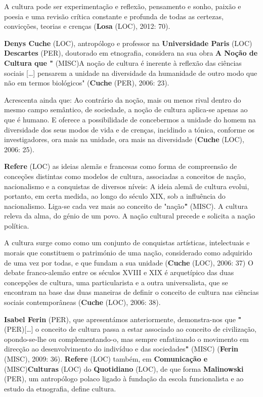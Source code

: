 \documentclass[12pt,a4paper]{article}
\begin{document}
A cultura pode ser experimentação e reflexão, pensamento e sonho, paixão e poesia e uma revisão crítica constante e profunda de todas as certezas, convicções, teorias e crenças (\textbf{Losa} (LOC), 2012: 70).

\textbf{Denys  Cuche} (LOC),  antropólogo  e  professor  na  \textbf{Universidade  Paris} (LOC)  \textbf{Descartes} (PER), doutorado em  etnografia, considera na sua obra \textbf{A Noção de Cultura que "} (MISC)A noção de cultura é inerente à reflexão das ciências sociais […] pensarem a unidade na diversidade da humanidade de outro modo que não em termos biológicos" (\textbf{Cuche} (PER), 2006: 23).

Acrescenta ainda que: Ao  contrário  da  noção,  mais  ou  menos  rival  dentro  do  mesmo  campo  semântico,  de sociedade, a noção de cultura aplica-se apenas ao que é humano. E oferece a possibilidade de concebermos a unidade do homem na diversidade dos seus modos de vida e de crenças, incidindo  a  tónica,  conforme  os  investigadores,  ora  mais  na  unidade,  ora  mais  na diversidade (\textbf{Cuche} (LOC), 2006: 25).

\textbf{Refere} (LOC)  as  ideias  alemãs  e  francesas  como  forma  de  compreensão  de  conceções distintas  como  modelos  de  cultura,  associadas  a  conceitos  de  nação,  nacionalismo  e  a conquistas de diversos níveis: A ideia alemã de cultura evolui, portanto, em certa medida, ao longo do século XIX, sob a influência do nacionalismo. Liga-se cada vez mais ao conceito de "nação\textbf{"} (MISC). A cultura releva da alma, do génio de um povo. A nação cultural precede e solicita a nação política.

A cultura surge como como um conjunto de conquistas artísticas, intelectuais e morais que constituem o património de uma nação, considerado como adquirido de uma vez por todas, e que fundam a sua unidade (\textbf{Cuche} (LOC), 2006: 37) O debate franco-alemão entre os séculos XVIII e XIX é arquetípico das duas concepções de cultura, uma particularista e a outra universalista, que se encontram na base das duas maneiras de definir o conceito de cultura nas ciências sociais contemporâneas (\textbf{Cuche} (LOC), 2006: 38).

\textbf{Isabel  Ferin} (PER),  que  apresentámos  anteriormente,  demonstra-nos  que    \textbf{"} (PER)[…]  o conceito de cultura passa a estar associado ao conceito de civilização, opondo-se-lhe ou complementando-o,  mas  sempre  enfatizando  o  movimento  em  direcção  ao desenvolvimento do indivíduo e das sociedades\textbf{"} (MISC) (\textbf{Ferin} (MISC), 2009: 36). \textbf{Refere} (LOC) também, em \textbf{Comunicação  e} (MISC)\textbf{Culturas} (LOC)  do  \textbf{Quotidiano} (LOC), de  que  forma  \textbf{Malinowski} (PER),  um  antropólogo polaco ligado à fundação da escola funcionalista e ao estudo da etnografia, define cultura.
\end{document}
